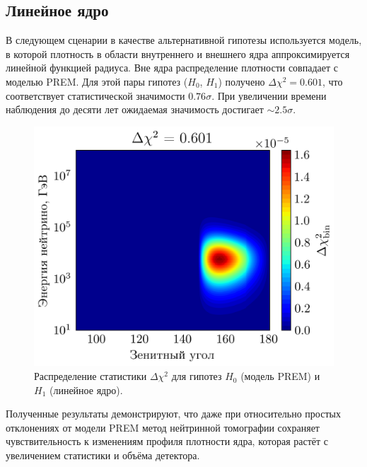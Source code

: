 \subsection{Линейное ядро}

В следующем сценарии в качестве альтернативной гипотезы используется модель, в которой плотность в области внутреннего и внешнего ядра аппроксимируется линейной функцией радиуса.  
Вне ядра распределение плотности совпадает с моделью PREM.  
Для этой пары гипотез ($H_0$, $H_1$) получено $\Delta\chi^2 = 0.601$, что соответствует статистической значимости $0.76\sigma$.  
При увеличении времени наблюдения до десяти лет ожидаемая значимость достигает $\sim 2.5\sigma$.

\begin{figure}[!h]
    \centering
    \includegraphics[width=\linewidth]{images/NuProp/chi2_rzf_2dxsCT10nlo_PREM_vs_PREM_lin_ker.png}
    \caption{Распределение статистики $\Delta\chi^2$ для гипотез $H_0$ (модель PREM) и $H_1$ (линейное ядро).}
    \label{NuTom3}
\end{figure}

Полученные результаты демонстрируют, что даже при относительно простых отклонениях от модели PREM метод нейтринной томографии сохраняет чувствительность к изменениям профиля плотности ядра, которая растёт с увеличением статистики и объёма детектора.
